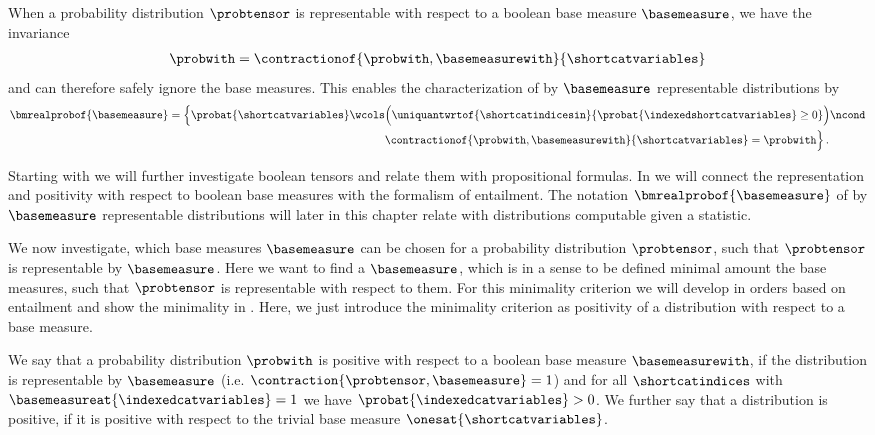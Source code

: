 When a probability distribution $\probtensor$ is representable with respect to a boolean base measure $\basemeasure$, we have the invariance
\begin{align*}
    \probwith=\contractionof{\probwith,\basemeasurewith}{\shortcatvariables}
\end{align*}
and can therefore safely ignore the base measures.
This enables the characterization of by $\basemeasure$ representable distributions by
\begin{align*}
    \bmrealprobof{\basemeasure}
    = \Big\{ \probat{\shortcatvariables} \wcols
    & \Big(\uniquantwrtof{\shortcatindicesin}{\probat{\indexedshortcatvariables}\geq0}\Big) \ncond \\
    & \contractionof{\probwith,\basemeasurewith}{\shortcatvariables} = \probwith \Big\} \, .
\end{align*}

Starting with  we will further investigate boolean tensors and relate them with propositional formulas.
In  we will connect the representation and positivity with respect to boolean base measures with the formalism of entailment.
The notation $\bmrealprobof{\basemeasure}$ of by $\basemeasure$ representable distributions will later in this chapter relate with distributions computable given a statistic. %

We now investigate, which base measures $\basemeasure$ can be chosen for a probability distribution $\probtensor$, such that $\probtensor$ is representable by $\basemeasure$.
Here we want to find a $\basemeasure$, which is in a sense to be defined minimal amount the base measures, such that $\probtensor$ is representable with respect to them.
For this minimality criterion we will develop in  orders based on entailment and show the minimality in .
Here, we just introduce the minimality criterion as positivity of a distribution with respect to a base measure.

\begin{definition}
    \label{def:positivityBaseMeasure}
    We say that a probability distribution $\probwith$ is positive with respect to a boolean base measure $\basemeasurewith$, if the distribution is representable by $\basemeasure$ (i.e. $\contraction{\probtensor,\basemeasure}=1$) and for all $\shortcatindices$ with $\basemeasureat{\indexedcatvariables}=1$ we have $\probat{\indexedcatvariables}>0$.
    We further say that a distribution is positive, if it is positive with respect to the trivial base measure $\onesat{\shortcatvariables}$.
\end{definition}

